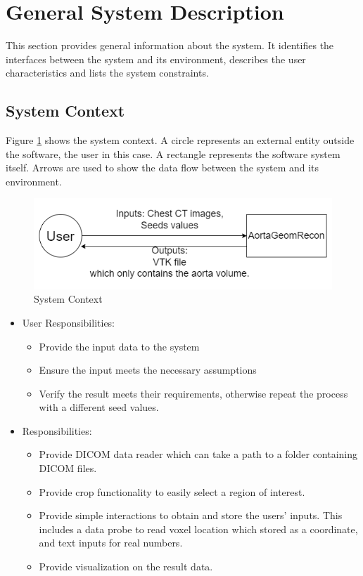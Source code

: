 \documentclass[12pt]{article}
\begin{document}
\section{General System Description}

This section provides general information about the system.  It identifies the
interfaces between the system and its environment, describes the user
characteristics and lists the system constraints.  

\subsection{System Context}
Figure \ref{Fig_SystemContext} shows the system context.  A circle represents an
external entity outside the software, the user in this case.  A rectangle
represents the software system itself.  Arrows are used to show the data
flow between the system and its environment. \\


\begin{figure}[H]
\begin{center}
 \includegraphics[width=1\textwidth]{AortaSystemContext.png}
\caption{System Context}
\label{Fig_SystemContext} 
\end{center}
\end{figure}


\begin{itemize}
\item User Responsibilities:
\begin{itemize}
\item Provide the input data to the system
\item Ensure the input meets the necessary assumptions
\item Verify the result meets their requirements, otherwise repeat the process with a different seed values.
\end{itemize}
\item \progname{} Responsibilities:
\begin{itemize}
\item Provide DICOM data reader which can take a path to a folder containing DICOM files.
\item Provide crop functionality to easily select a region of interest. 
\item Provide simple interactions to obtain and store the users' inputs. This includes a data probe to read voxel location which stored as a coordinate, and text inputs for real numbers.
\item Provide visualization on the result data.
\end{itemize}
\end{itemize}
\end{document}
